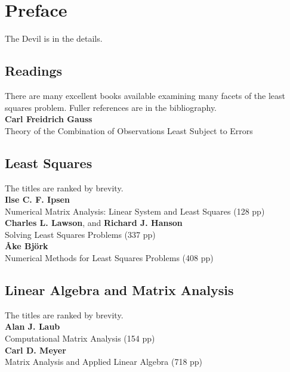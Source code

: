 \chapter{Preface}
The Devil is in the details.

\section{Readings}
There are many excellent books available examining many facets of the least squares problem. Fuller references are in the bibliography. \\

\noindent
\textbf{Carl Freidrich Gauss}\\
Theory of the Combination of Observations Least Subject to Errors

\section{Least Squares}  %
The titles are ranked by brevity. \\
 
\noindent
\textbf{Ilse C. F. Ipsen}\\
Numerical Matrix Analysis: Linear System and Least Squares (128 pp) \\

\noindent
\textbf{Charles L. Lawson}, and \textbf{Richard J. Hanson}\\
Solving Least Squares Problems (337 pp) \\

\noindent
\textbf{{\AA}ke Bj{\"o}rk}\\
Numerical Methods for Least Squares Problems (408 pp) \\

\section{Linear Algebra and Matrix Analysis}  %
The titles are ranked by brevity. \\

\noindent
\textbf{Alan J. Laub}\\
Computational Matrix Analysis (154 pp) \\

\noindent
\textbf{Carl D. Meyer}\\
Matrix Analysis and Applied Linear Algebra (718 pp) \\

